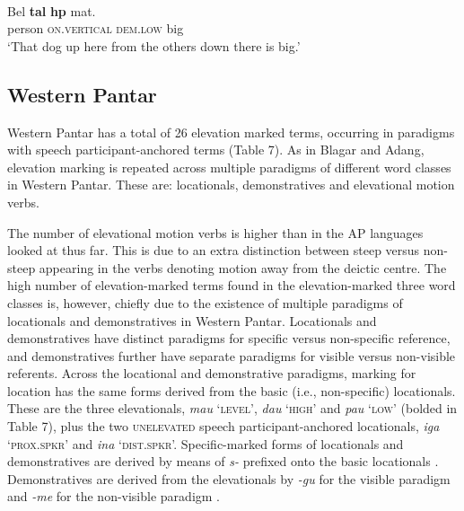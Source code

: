 \documentclass[output=paper]{LSP/langsci}
\begin{document}
    

\ea%
\label{ex:7:29}
 \\
\gll  Bel  \textbf{tal{\textepsilon}} \textbf{h{\textepsilon}p{\textopeno}} mat{\textepsilon}.  \\
   person  \textsc{on.vertical} \textsc{dem.low} big    \\
\glt   `That dog up here from the others down there is big.'
\z



    



\subsection{Western Pantar}
Western Pantar has a total of 26 elevation marked terms, occurring in paradigms with speech participant-anchored terms (Table 7). As in Blagar and Adang, elevation marking is repeated across multiple paradigms of different word classes in Western Pantar. These are: locationals, demonstratives and elevational motion verbs. 

The number of elevational motion verbs is higher than in the AP languages looked at thus far. This is due to an extra distinction between steep versus non-steep appearing in the verbs denoting motion away from the deictic centre. The high number of elevation-marked terms found in the elevation-marked three word classes is, however, chiefly due to the existence of multiple paradigms of locationals and demonstratives in Western Pantar. Locationals and demonstratives have distinct paradigms for specific versus non-specific reference, and demonstratives further have separate paradigms for visible versus non-visible referents. Across the locational and demonstrative paradigms, marking for location has the same forms derived from the basic (i.e., non-specific) locationals. These are the three elevationals, \textit{mau} `\textsc{level',} \textit{dau} `\textsc{high'} and \textit{pau} `\textsc{low'} (bolded in Table 7)\textsc{,} plus the two \textsc{unelevated} speech participant-anchored locationals, \textit{iga} `\textsc{prox.spkr'} and \textit{ina} `\textsc{dist.spkr'.} Specific-marked forms of locationals and demonstratives are derived by means of \textit{s-} prefixed onto the basic locationals . Demonstratives are derived from the elevationals by \textit{{}-gu} for the visible paradigm and \textit{{}-me} for the non-visible paradigm .
\end{document}
